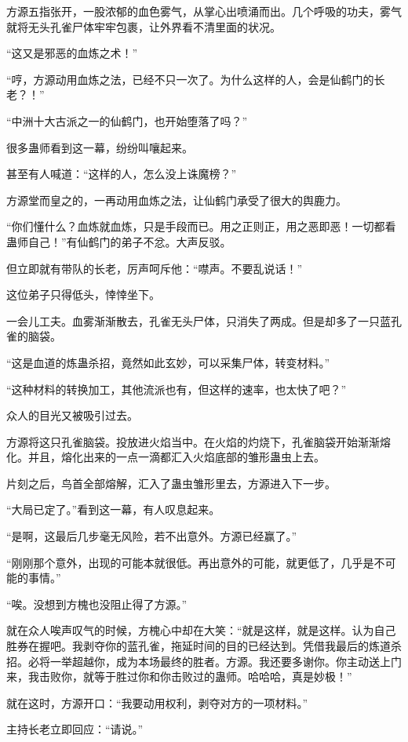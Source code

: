\begin{this_body}
方源五指张开，一股浓郁的血色雾气，从掌心出喷涌而出。几个呼吸的功夫，雾气就将无头孔雀尸体牢牢包裹，让外界看不清里面的状况。

“这又是邪恶的血炼之术！”

“哼，方源动用血炼之法，已经不只一次了。为什么这样的人，会是仙鹤门的长老？！”

“中洲十大古派之一的仙鹤门，也开始堕落了吗？”

很多蛊师看到这一幕，纷纷叫嚷起来。

甚至有人喊道：“这样的人，怎么没上诛魔榜？”

方源堂而皇之的，一再动用血炼之法，让仙鹤门承受了很大的舆鹿力。

“你们懂什么？血炼就血炼，只是手段而已。用之正则正，用之恶即恶！一切都看蛊师自己！”有仙鹤门的弟子不忿。大声反驳。

但立即就有带队的长老，厉声呵斥他：“噤声。不要乱说话！”

这位弟子只得低头，悻悻坐下。

一会儿工夫。血雾渐渐散去，孔雀无头尸体，只消失了两成。但是却多了一只蓝孔雀的脑袋。

“这是血道的炼蛊杀招，竟然如此玄妙，可以采集尸体，转变材料。”

“这种材料的转换加工，其他流派也有，但这样的速率，也太快了吧？”

众人的目光又被吸引过去。

方源将这只孔雀脑袋。投放进火焰当中。在火焰的灼烧下，孔雀脑袋开始渐渐熔化。并且，熔化出来的一点一滴都汇入火焰底部的雏形蛊虫上去。

片刻之后，鸟首全部熔解，汇入了蛊虫雏形里去，方源进入下一步。

“大局已定了。”看到这一幕，有人叹息起来。

“是啊，这最后几步毫无风险，若不出意外。方源已经赢了。”

“刚刚那个意外，出现的可能本就很低。再出意外的可能，就更低了，几乎是不可能的事情。”

“唉。没想到方槐也没阻止得了方源。”

就在众人唉声叹气的时候，方槐心中却在大笑：“就是这样，就是这样。认为自己胜券在握吧。我剥夺你的蓝孔雀，拖延时间的目的已经达到。凭借我最后的炼道杀招。必将一举超越你，成为本场最终的胜者。方源。我还要多谢你。你主动送上门来，我击败你，就等于胜过你和你击败过的蛊师。哈哈哈，真是妙极！”

就在这时，方源开口：“我要动用权利，剥夺对方的一项材料。”

主持长老立即回应：“请说。”


\end{this_body}
